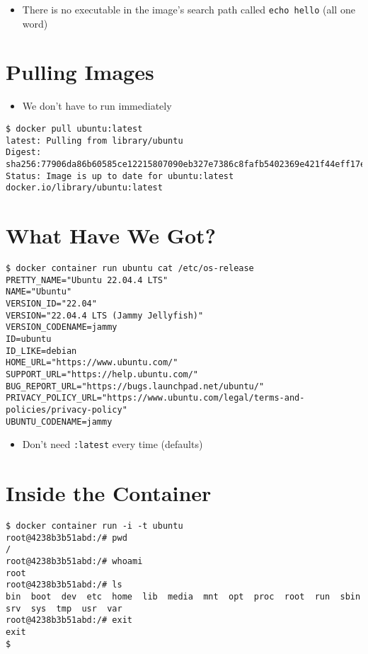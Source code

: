 \documentclass[krantzl]{krantz}
\begin{document}
\begin{itemize}
\item There is no executable in the image’s search path called \texttt{echo hello} (all one word)

\end{itemize}
\section{Pulling Images}
\begin{itemize}
\item We don’t have to run immediately

\end{itemize}
\begin{lstlisting}[frame=tblr,backgroundcolor=\color{black!5}]
$ docker pull ubuntu:latest
latest: Pulling from library/ubuntu
Digest: sha256:77906da86b60585ce12215807090eb327e7386c8fafb5402369e421f44eff17e
Status: Image is up to date for ubuntu:latest
docker.io/library/ubuntu:latest
\end{lstlisting}

\section{What Have We Got?}
\begin{lstlisting}[frame=tblr,backgroundcolor=\color{black!5}]
$ docker container run ubuntu cat /etc/os-release
PRETTY_NAME="Ubuntu 22.04.4 LTS"
NAME="Ubuntu"
VERSION_ID="22.04"
VERSION="22.04.4 LTS (Jammy Jellyfish)"
VERSION_CODENAME=jammy
ID=ubuntu
ID_LIKE=debian
HOME_URL="https://www.ubuntu.com/"
SUPPORT_URL="https://help.ubuntu.com/"
BUG_REPORT_URL="https://bugs.launchpad.net/ubuntu/"
PRIVACY_POLICY_URL="https://www.ubuntu.com/legal/terms-and-policies/privacy-policy"
UBUNTU_CODENAME=jammy
\end{lstlisting}

\begin{itemize}
\item Don’t need \texttt{:latest} every time (defaults)

\end{itemize}
\section{Inside the Container}
\begin{lstlisting}[frame=tblr,backgroundcolor=\color{black!5}]
$ docker container run -i -t ubuntu
root@4238b3b51abd:/# pwd
/
root@4238b3b51abd:/# whoami
root
root@4238b3b51abd:/# ls
bin  boot  dev  etc  home  lib  media  mnt  opt  proc  root  run  sbin  srv  sys  tmp  usr  var
root@4238b3b51abd:/# exit
exit
$
\end{lstlisting}
\end{document}
